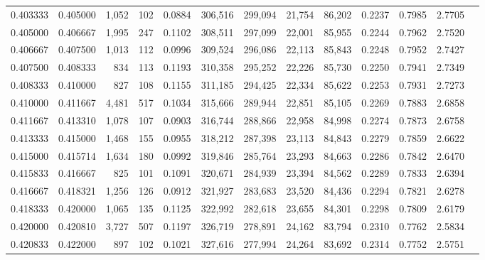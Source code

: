 \begin{tabular}{rrrrrrrrrrrrr}
0.403333 & 0.405000 & 1,052 & 102 &                                     0.0884 & 306,516 & 299,094 &  21,754 &  86,202 & 0.2237 & 0.7985 & 2.7705 \\
0.405000 & 0.406667 & 1,995 & 247 &                                     0.1102 & 308,511 & 297,099 &  22,001 &  85,955 & 0.2244 & 0.7962 & 2.7520 \\
0.406667 & 0.407500 & 1,013 & 112 &                                     0.0996 & 309,524 & 296,086 &  22,113 &  85,843 & 0.2248 & 0.7952 & 2.7427 \\
0.407500 & 0.408333 &   834 & 113 &                                     0.1193 & 310,358 & 295,252 &  22,226 &  85,730 & 0.2250 & 0.7941 & 2.7349 \\
0.408333 & 0.410000 &   827 & 108 &                                     0.1155 & 311,185 & 294,425 &  22,334 &  85,622 & 0.2253 & 0.7931 & 2.7273 \\
0.410000 & 0.411667 & 4,481 & 517 &                                     0.1034 & 315,666 & 289,944 &  22,851 &  85,105 & 0.2269 & 0.7883 & 2.6858 \\
0.411667 & 0.413310 & 1,078 & 107 &                                     0.0903 & 316,744 & 288,866 &  22,958 &  84,998 & 0.2274 & 0.7873 & 2.6758 \\
0.413333 & 0.415000 & 1,468 & 155 &                                     0.0955 & 318,212 & 287,398 &  23,113 &  84,843 & 0.2279 & 0.7859 & 2.6622 \\
0.415000 & 0.415714 & 1,634 & 180 &                                     0.0992 & 319,846 & 285,764 &  23,293 &  84,663 & 0.2286 & 0.7842 & 2.6470 \\
0.415833 & 0.416667 &   825 & 101 &                                     0.1091 & 320,671 & 284,939 &  23,394 &  84,562 & 0.2289 & 0.7833 & 2.6394 \\
0.416667 & 0.418321 & 1,256 & 126 &                                     0.0912 & 321,927 & 283,683 &  23,520 &  84,436 & 0.2294 & 0.7821 & 2.6278 \\
0.418333 & 0.420000 & 1,065 & 135 &                                     0.1125 & 322,992 & 282,618 &  23,655 &  84,301 & 0.2298 & 0.7809 & 2.6179 \\
0.420000 & 0.420810 & 3,727 & 507 &                                     0.1197 & 326,719 & 278,891 &  24,162 &  83,794 & 0.2310 & 0.7762 & 2.5834 \\
0.420833 & 0.422000 &   897 & 102 &                                     0.1021 & 327,616 & 277,994 &  24,264 &  83,692 & 0.2314 & 0.7752 & 2.5751 \\

\end{tabular}
